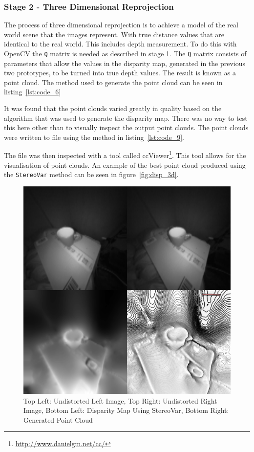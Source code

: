 \documentclass[11pt,oneside]{report}
\newcommand\code[1]{\texttt{#1}}
\begin{document}
		\subsubsection{Stage 2 - Three Dimensional Reprojection}
			The process of three dimensional reprojection is to achieve a model of the real world scene that the images represent. 
			With true distance values that are identical to the real world.
			This includes depth measurement.
			To do this with OpenCV the \code{Q} matrix is needed as described in stage 1.
			The \code{Q} matrix consists of parameters that allow the values in the disparity map, generated in the previous two prototypes, to be turned into true depth values.
			The result is known as a point cloud.
			The method used to generate the point cloud can be seen in listing~\ref{lst:code_6}
				
			It was found that the point clouds varied greatly in quality based on the algorithm that was used to generate the disparity map.
			There was no way to test this here other than to visually inspect the output point clouds.
			The point clouds were written to file using the method in listing~\ref{lst:code_9}.
			
			The file was then inspected with a tool called ccViewer\footnote{\url{http://www.danielgm.net/cc/}}.
			This tool allows for the visualisation of point clouds.
			An example of the best point cloud produced using the \code{StereoVar} method can be seen in figure~\ref{fig:disp_3d}.
			\begin{figure}
			\centering
    				\includegraphics[width=\textwidth]{disp_3d}
    			\caption{Top Left: Undistorted Left Image, Top Right: Undistorted Right Image, Bottom Left: Disparity Map Using StereoVar, Bottom Right: Generated Point Cloud \protect {\label{fig:disp_3d}}}

			\end{figure}	
\end{document}
